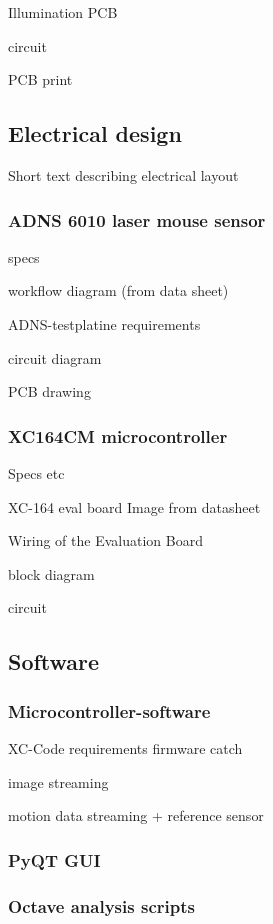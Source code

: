 \documentclass[12pt,a4paper]{article}
\begin{document}
  Illumination PCB

  circuit

  PCB print


\subsection{Electrical design}

Short text describing electrical layout


\subsubsection{ADNS 6010 laser mouse sensor}

specs

workflow diagram (from data sheet)

ADNS-testplatine
  requirements

  circuit diagram

  PCB drawing

\subsubsection{XC164CM microcontroller}

Specs etc

XC-164 eval board 
  Image from datasheet

Wiring of the Evaluation Board

  block diagram

  circuit

\subsection{Software}

\subsubsection{Microcontroller-software}

  XC-Code
    requirements
    firmware catch

    image streaming

    motion data streaming
      + reference sensor

\subsubsection{PyQT GUI}

\subsubsection{Octave analysis scripts}
\end{document}
